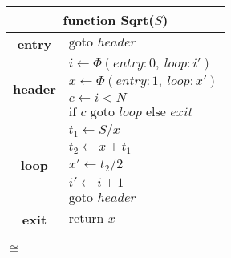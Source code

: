 \centering
{}
\begin{minipage}{0.42\textwidth}
\begin{tabular}{|cl|}
\multicolumn{2}{c}{{\bf function} Sqrt($S$)}\\
\hline
{\bf entry} & $\text{goto } header$\\
\hline
\multirow{4}{*}{\bf header} & $i \leftarrow \Phi(entry:0,\ loop:i')$\\
                            & $x \leftarrow \Phi(entry:1,\ loop:x')$\\
                            & $c \leftarrow i<N$\\
                            & $\text{if }c\text{ goto }loop\text{ else }exit$\\
\hline
\multirow{5}{*}{\bf loop} & $t_1\leftarrow S/x$\\
                          & $t_2\leftarrow x+t_1$\\
                          & $x'\leftarrow t_2/2$\\
                          & $i'\leftarrow i+1$\\
                          & $\text{goto }header$\\
\hline
{\bf exit} & $\text{return }x$\\
\hline
\end{tabular}
\end{minipage}

\vspace{3.2mm}
{\huge
$\cong$}
\vspace{3.2mm}

